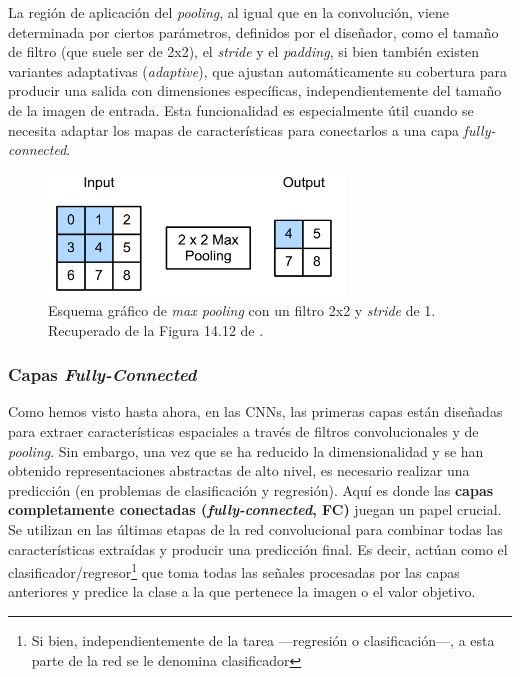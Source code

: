 La región de aplicación del \textit{pooling}, al igual que en la convolución, viene determinada por ciertos 
parámetros, definidos por el diseñador, como el tamaño de filtro (que suele ser de 2x2), el \textit{stride} 
y el \textit{padding}, si bien también existen variantes  adaptativas (\textit{adaptive}), que ajustan
automáticamente su cobertura para producir una salida con dimensiones específicas, independientemente del 
tamaño de la imagen de entrada. Esta funcionalidad es especialmente útil cuando se necesita adaptar los mapas
de características para conectarlos a una capa \textit{fully-connected}. 

\begin{figure}[h]
    \centering
    \includegraphics[width=0.7\textwidth]{capitulos/cap_02/imagenes/max_pooling.png}
    \caption{
        Esquema gráfico de \textit{max pooling} con un filtro 2x2 y \textit{stride} de 1.
        Recuperado de la Figura 14.12 de \cite{murphy2022}.
    } 
    \label{fig:max_pooling}
\end{figure}



\subsubsection{Capas \textit{Fully-Connected}}

Como hemos visto hasta ahora, en las CNNs, las primeras capas están diseñadas para extraer características
espaciales a través de filtros convolucionales y de \textit{pooling}. Sin embargo, una vez que se ha reducido 
la dimensionalidad y se han obtenido representaciones abstractas de alto nivel, es necesario realizar una 
predicción (en problemas de clasificación y regresión). 
Aquí es donde las \textbf{capas completamente conectadas (\textit{fully-connected}, FC)} juegan un papel 
crucial. Se utilizan en las últimas etapas de la red convolucional para combinar todas las características 
extraídas y producir una predicción final. Es decir, actúan como el clasificador/regresor\footnote{
    Si bien, independientemente de la tarea ---regresión o clasificación---, a esta parte de la red se le 
    denomina clasificador
} que toma todas las señales 
procesadas por las capas anteriores y predice la clase a la que pertenece la imagen o el valor objetivo. 

